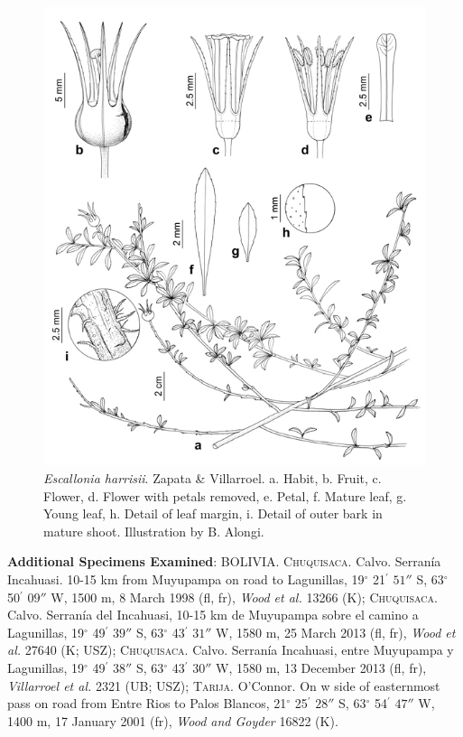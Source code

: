 \documentclass[fleqn,10pt,lineno]{wlpeerj} %
\begin{document}
\begin{figure}[ht]
\centering
\includegraphics[width=\linewidth]{Figure6_Eh}
\caption{\emph{Escallonia harrisii}. Zapata \& Villarroel. a. Habit, b. Fruit, c. Flower, d. Flower with petals removed, e. Petal, f. Mature leaf, g. Young leaf, h. Detail of leaf margin, i. Detail of outer bark in mature shoot. Illustration by B. Alongi.}
\label{fig:Figure6_Eh}
\end{figure}

\textbf{Additional Specimens Examined}: BOLIVIA. \textsc{Chuquisaca}. Calvo. Serranía Incahuasi. 10-15 km from Muyupampa on road to Lagunillas, 19$^\circ$ 21$^\prime$ $51''$ S, 63$^\circ$ 50$^\prime$ $09''$ W, 1500 m, 8 March 1998 (fl, fr), \textit{Wood et al.} 13266 (K); \textsc{Chuquisaca}. Calvo. Serranía del Incahuasi, 10-15 km de Muyupampa sobre el camino a Lagunillas, 19$^\circ$ 49$^\prime$ $39''$ S, 63$^\circ$ 43$^\prime$ $31''$ W, 1580 m, 25 March 2013 (fl, fr), \textit{Wood et al.} 27640 (K; USZ); \textsc{Chuquisaca}. Calvo. Serranía Incahuasi, entre Muyupampa y Lagunillas, 19$^\circ$ 49$^\prime$ $38''$  S, 63$^\circ$ 43$^\prime$ $30''$ W, 1580 m, 13 December 2013 (fl, fr), \textit{Villarroel et al.} 2321 (UB; USZ); \textsc{Tarija}. O’Connor. On w side of easternmost pass on road from Entre Rios to Palos Blancos, 21$^\circ$ 25$^\prime$ $28''$ S, 63$^\circ$ 54$^\prime$ $47''$ W, 1400 m, 17 January 2001 (fr), \textit{Wood and Goyder} 16822 (K).
\end{document}
